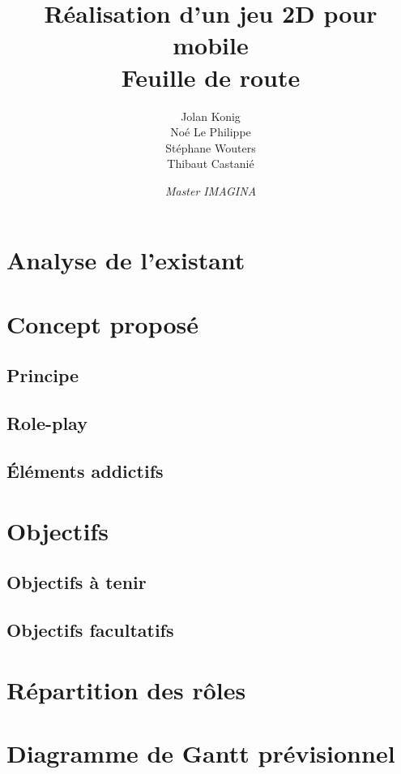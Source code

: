 \documentclass[a4paper,11pt]{article}
\begin{document}
\title{\textbf{Réalisation d'un jeu 2D pour mobile}\\Feuille de route}
\author{Jolan Konig\\Noé Le Philippe\\Stéphane Wouters\\Thibaut Castanié}
\date{\textit{Master IMAGINA}}

\maketitle
\thispagestyle{empty}

\newpage 

\tableofcontents

\newpage 

\section{Analyse de l'existant}

\section{Concept proposé}
\subsection{Principe}
\subsection{Role-play}
\subsection{Éléments addictifs}

\section{Objectifs} %
\subsection{Objectifs à tenir} %
\subsection{Objectifs facultatifs} %

\section{Répartition des rôles}

\section{Diagramme de Gantt prévisionnel}
\end{document}
